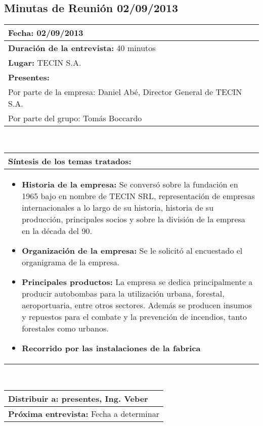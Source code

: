 \subsection{Minutas de Reunión 02/09/2013}
\begin{flushleft}
	\begin{tabular}{|p{15cm}|}
		\hline
		\textbf{Fecha:} 02/09/2013 \\ \hline
		\textbf{Duración de la entrevista:} 40 minutos\\ \hline
		\textbf{Lugar:} TECIN S.A.\\ \hline
		\textbf{Presentes:} \\
			Por parte de la empresa: Daniel Abé, Director General de TECIN S.A. \\ 
			Por parte del grupo: Tomás Boccardo \\ \hline
	\end{tabular}  \\
	\vspace{0.7cm}
	\begin{tabular}{|p{15cm}|}
		\hline
		\textbf{Síntesis de los temas tratados:}\\
		\hline
		\begin{itemize}
			\item \textbf{Historia de la empresa:}
			Se conversó sobre la fundación en 1965 bajo en nombre de TECIN SRL, representación de empresas internacionales a lo 				largo de su historia, historia de su producción, principales socios y sobre la división de la empresa en la década 					del 90.

		\item \textbf{Organización de la empresa:} 
		Se le solicitó al encuestado el organigrama de la empresa.

		\item \textbf{Principales productos:} La empresa se dedica principalmente a producir autobombas para 
		la utilización urbana, forestal, aeroportuaria, entre otros sectores. Además se producen insumos y repuestos para el 				combate y la prevención de incendios, tanto forestales como urbanos.
		
		\item \textbf{Recorrido por las instalaciones de la fabrica}

		\end{itemize} \\ \hline
	\end{tabular} \\
	\vspace{0.7cm}
	\begin{tabular}{|p{15cm}|}                
		\hline 
		\textbf{Distribuir a:} presentes, Ing. Veber\\
		\hline
		\textbf{Próxima entrevista:} Fecha a determinar\\
		\hline
	\end{tabular}	
	
\end{flushleft}